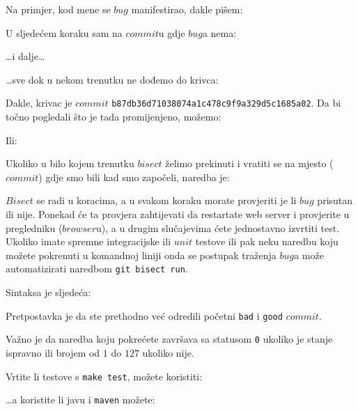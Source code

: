 Na primjer, kod mene se $bug$ manifestirao, dakle pišem:



U sljedećem koraku sam na $commit$u gdje $bug$a nema:



\dots{}i dalje\dots



\dots{}sve dok u nekom trenutku ne dođemo do krivca:



Dakle, krivac je $commit$ \verb+b87db36d71038074a1c478c9f9a329d5c1685a02+.
Da bi točno pogledali što je tada promijenjeno, možemo:


Ili:


Ukoliko u bilo kojem trenutku $bisect$ želimo prekinuti i vratiti se na mjesto ($commit$) gdje smo bili kad smo započeli, naredba je:



$Bisect$ se radi u koracima, a u svakom koraku morate provjeriti je li $bug$ prisutan ili nije.
Ponekad će ta provjera zahtijevati da restartate web server i provjerite u pregledniku ($browser$u), a u drugim slučajevima ćete jednostavno izvrtiti test.
Ukoliko imate spremne integracijske ili $unit$ testove ili pak neku naredbu koju možete pokrenuti u komandnoj liniji onda se postupak traženja $bug$a može automatizirati naredbom \verb+git bisect run+.

Sintaksa je sljedeća:


Pretpostavka je da ste prethodno već odredili početni \verb+bad+ i \verb+good+ $commit$.

Važno je da naredba koju pokrećete završava sa statusom \verb+0+ ukoliko je stanje ispravno ili brojem od $1$ do $127$ ukoliko nije.

Vrtite li testove s \verb+make test+, možete koristiti: 


\dots{}a koristite li javu i \verb+maven+ možete:


